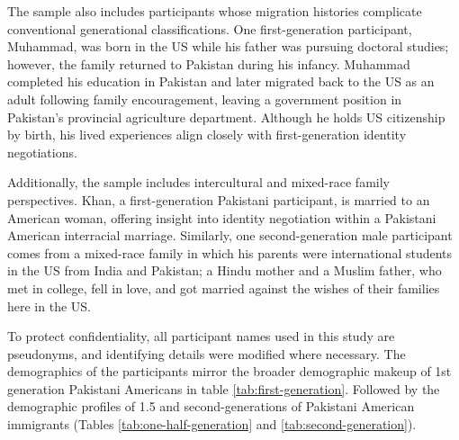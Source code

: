 The sample also includes participants whose migration histories complicate conventional generational classifications. One first-generation participant, Muhammad, was born in the US while his father was pursuing doctoral studies; however, the family returned to Pakistan during his infancy. Muhammad completed his education in Pakistan and later migrated back to the US as an adult following family encouragement, leaving a government position in Pakistan’s provincial agriculture department. Although he holds US citizenship by birth, his lived experiences align closely with first-generation identity negotiations. 	

Additionally, the sample includes intercultural and mixed-race family perspectives. Khan, a first-generation Pakistani participant, is married to an American woman, offering insight into identity negotiation within a Pakistani American interracial marriage. Similarly, one second-generation male participant comes from a mixed-race family in which his parents were international students in the US from India and Pakistan; a Hindu mother and a Muslim father, who met in college, fell in love, and got married against the wishes of their families here in the US.

To protect confidentiality, all participant names used in this study are pseudonyms, and identifying details were modified where necessary. The demographics of the participants mirror the broader demographic makeup of 1st generation Pakistani Americans in table \ref{tab:first-generation}. Followed by the demographic profiles of 1.5 and second-generations of Pakistani American immigrants (Tables \ref{tab:one-half-generation} and \ref{tab:second-generation}).

